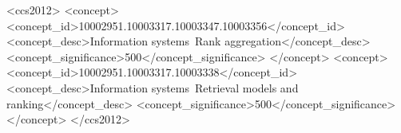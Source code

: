 \documentclass[sigconf,natbib=true,anonymous=true]{acmart}
\begin{document}
\begin{CCSXML}
<ccs2012>
   <concept>
       <concept_id>10002951.10003317.10003347.10003356</concept_id>
       <concept_desc>Information systems~Rank aggregation</concept_desc>
       <concept_significance>500</concept_significance>
   </concept>
   <concept>
       <concept_id>10002951.10003317.10003338</concept_id>
       <concept_desc>Information systems~Retrieval models and ranking</concept_desc>
       <concept_significance>500</concept_significance>
   </concept>
</ccs2012>
\end{CCSXML}



\maketitle













\end{document}
